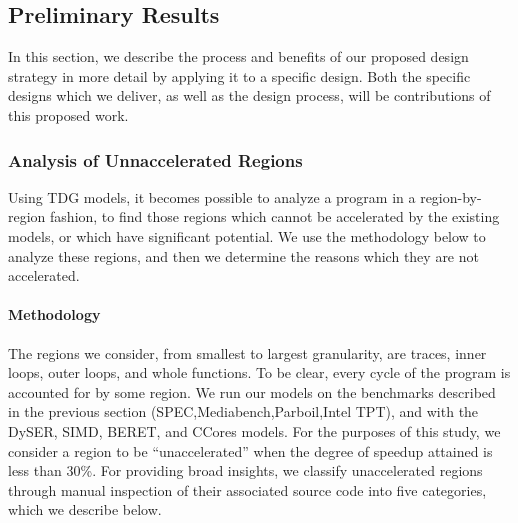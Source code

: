 \subsection{Preliminary Results} 

In this section, we describe the process and benefits of our
proposed design strategy in more detail by applying it to a specific design.
Both the specific designs which we deliver, as well as the design process,
will be contributions of this proposed work.

\subsubsection{Analysis of Unnaccelerated Regions} \label{sec:unexplored}


Using TDG models, it becomes possible to analyze a program in a
region-by-region fashion, to find those regions which cannot be accelerated by
the existing models, or which have significant potential.  
We use the methodology below to analyze these regions, and
then we determine the reasons which they are not accelerated.

\paragraph{Methodology} The regions we consider, from smallest to largest granularity,
are traces, inner loops, outer loops, and whole functions.  To be clear, every cycle
of the program is accounted for by some region. We run our models on 
the benchmarks described in the previous section (SPEC,Mediabench,Parboil,Intel TPT), 
and with the DySER, SIMD, BERET, and CCores models.  For the purposes of this study, 
we consider a region to be ``unaccelerated'' when the degree of speedup attained is
less than 30\%.  For providing broad insights, we classify unaccelerated regions
through manual inspection of their associated source code 
into five categories, which we describe below.

